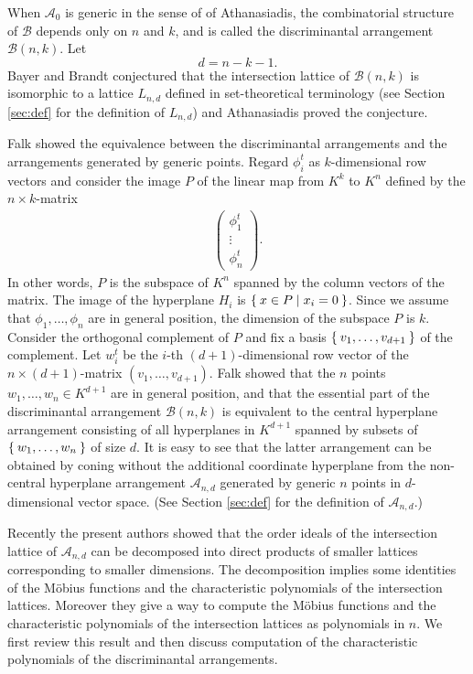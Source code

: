 \documentclass{wstmp}
\begin{document}
When ${\mathcal{A}}_0$ is generic in the sense of 
of Athanasiadis\cite{athanasiadis2000},   
the combinatorial structure of ${\mathcal{B}}$
depends only on $n$ and $k$, and
is called the discriminantal arrangement ${\mathcal{B}}(n,k)$. 
Let 
\[
d=n-k-1.
\]
Bayer and Brandt\cite{bayer-brandt1997} conjectured that 
the intersection lattice of 
${\mathcal{B}}(n,k)$ is isomorphic 
to a lattice 
$L_{n,d}$ defined in set-theoretical terminology
(see Section \ref{sec:def} for the definition of $L_{n,d}$) and 
Athanasiadis\cite{athanasiadis2000} proved the conjecture.

Falk\cite{falk1994} showed the equivalence between  the discriminantal arrangements
and the  arrangements generated by generic points.
Regard $\phi_i^t$ as $k$-dimensional row vectors
and consider the image $P$ of the linear map 
from $K^{k}$ to 
$K^{n}$ defined by the $n\times k$-matrix
\begin{align*}
\begin{pmatrix}
\phi_1^t\\
\vdots\\
\phi_{n}^t
\end{pmatrix}.
\end{align*}
In other words, $P$ is the subspace of $K^n$ 
spanned by the column vectors of the matrix.
The image of the hyperplane $H_i$ is $\Set{x\in P|x_i=0}$.
Since we assume that $\phi_1,\ldots, 
\phi_n$  are in general position,
the dimension of the subspace $P$ is $k$.
Consider the orthogonal complement of $P$ 
and fix a basis $\Set{v_1,\ldots,v_{d+1}}$ of the complement.
Let $w_i^t$ be the $i$-th $(d+1)$-dimensional row vector of
the $n\times (d+1)$-matrix $(v_1,\ldots,v_{d+1})$.
Falk showed that 
the $n$ points $w_1,\ldots, w_n\in K^{d+1}$ 
are in general position, and that
the essential part of the discriminantal arrangement ${\mathcal{B}}(n,k)$ 
is equivalent to the central hyperplane arrangement
consisting of 
all hyperplanes in $K^{d+1}$
spanned by subsets of $\Set{w_1,\ldots, w_{n}}$ 
of size $d$. 
It is easy to see that
the latter arrangement
can be obtained 
by coning without the additional coordinate hyperplane  
from 
the non-central hyperplane arrangement ${\mathcal{A}}_{n,d}$ 
generated by generic 
$n$ points in $d$-dimensional vector space.
(See Section \ref{sec:def} for the definition of ${\mathcal{A}}_{n,d}$.) 

Recently 
the present authors showed that
the order ideals  of the intersection lattice of ${\mathcal{A}}_{n,d}$ 
can be decomposed into
direct products of smaller lattices corresponding to smaller dimensions\cite{1009.3676}.
The decomposition implies some identities of the M\"obius functions 
and the characteristic polynomials of the intersection lattices.
Moreover they give a way to compute 
the M\"obius functions 
and the characteristic polynomials of the intersection lattices
as polynomials in $n$. 
We first review this result and  then discuss computation of
the characteristic polynomials of the discriminantal arrangements.
\end{document}
